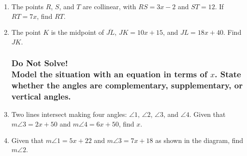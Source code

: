 \documentclass[12pt, twoside]{article}
\begin{document}
\begin{enumerate}
  \item The points $R$, $S$, and $T$ are collinear, with $RS=3x-2$ and $ST=12$. If $RT=7x$, find ${RT}$. \vspace{1cm}
  \begin{flushright}
    \end{flushright} \vspace{2cm}
    
  \item The point $K$ is the midpoint of $\overline{JL}$, $JK=10x+15$, and $JL=18x+40$. Find ${JK}$.  \vspace{1cm}
  \begin{flushright}
    \end{flushright} \vspace{2cm}

\newpage

  \subsubsection*{Do Not Solve! \\
  Model the situation with an equation in terms of $x$. State whether the angles are complementary, supplementary, or vertical angles.}

  \item Two lines intersect making four angles: $\angle 1$, $\angle 2$, $\angle 3$, and $\angle 4$. Given that $m\angle 3= 2x+50$ and $m\angle 4=6x+50$, find $x$.
  \begin{flushright}
  \end{flushright}

  \item Given that $m\angle 1= 5x+22$ and $m\angle 3=7x+18$ as shown in the diagram, find $m\angle 2$.
  \begin{flushright}
  \end{flushright}


\end{enumerate}
\end{document}
